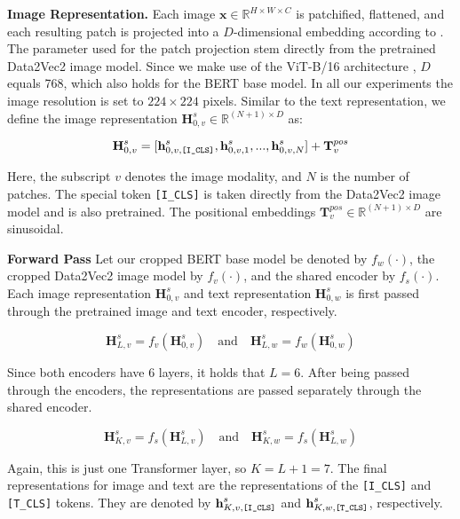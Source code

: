 \documentclass[10pt]{article} %
\begin{document}
\textbf{Image Representation.} Each image $\mathbf{x} \in \mathbb{R}^{H\times W\times C}$ is patchified, flattened, and each resulting patch
is projected into a $D$-dimensional embedding according to \citep{vit}. The parameter used for the patch projection stem directly from the
pretrained Data2Vec2 \citep{data2vec2} image model. Since we make use of the ViT-B/16 architecture \citep{vit}, $D$ equals 768, which
also holds for the BERT base model. In all our experiments the image resolution is set to $224\times 224$ pixels. Similar to the text
representation, we define the image representation $\textbf{H}^{s}_{0, v} \in \mathbb{R}^{(N+1)\times D}$ as:

\[
\textbf{H}^{s}_{0, v} = [\textbf{h}^{s}_{0, v, \text{\texttt{[I\_CLS]}}}, \textbf{h}^{s}_{0, v, 1}, ..., \textbf{h}^{s}_{0, v, N}] + \textbf{T}^{pos}_{v}
\]

Here, the subscript $v$ denotes the image modality, and $N$ is the number of patches. The special token \texttt{[I\_CLS]} is taken directly
from the Data2Vec2 \citep{data2vec2} image model and is also pretrained. The positional embeddings $\textbf{T}^{pos}_{v} \in \mathbb{R}^{(N+1)\times D}$ are sinusoidal.

\textbf{Forward Pass} Let our cropped BERT base model be denoted by $f_{w}(\cdot)$, the cropped Data2Vec2 image model by $f_{v}(\cdot)$, and the shared
encoder by $f_{s}(\cdot)$. Each image representation $\textbf{H}^{s}_{0, v}$ and text representation $\textbf{H}^{s}_{0, w}$ is first passed through
the pretrained image and text encoder, respectively.

\[
\textbf{H}^{s}_{L, v} = f_{v}(\textbf{H}^{s}_{0, v}) \quad \text{and} \quad \textbf{H}^{s}_{L, w} = f_{w}(\textbf{H}^{s}_{0, w})
\]

Since both encoders have 6 layers, it holds that $L=6$. After being passed through the encoders, the representations
are passed separately through the shared encoder.

\[
\textbf{H}^{s}_{K, v} = f_{s}(\textbf{H}^{s}_{L, v}) \quad \text{and} \quad \textbf{H}^{s}_{K, w} = f_{s}(\textbf{H}^{s}_{L, w})
\]

Again, this is just one Transformer layer, so $K=L+1=7$. The final representations for image and text are the representations
of the \texttt{[I\_CLS]} and \texttt{[T\_CLS]} tokens. They are denoted by $\textbf{h}^{s}_{K, v, \text{\texttt{[I\_CLS]}}}$ and
$\textbf{h}^{s}_{K, w, \text{\texttt{[T\_CLS]}}}$, respectively.
\end{document}
